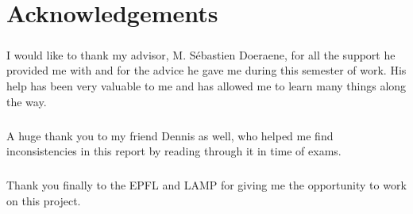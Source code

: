 \chapter*{Acknowledgements}

\paragraph{} I would like to thank my advisor, M. Sébastien Doeraene, for all the support he provided me with and for the advice he gave me during this semester of work. His help has been very valuable to me and has allowed me to learn many things along the way.

\paragraph{} A huge thank you to my friend Dennis as well, who helped me find inconsistencies in this report by reading through it in time of exams.

\paragraph{} Thank you finally to the EPFL and LAMP for giving me the opportunity to work on this project.